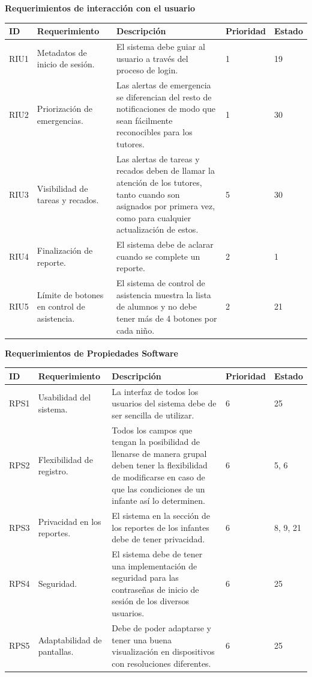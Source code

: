 \documentclass{article}
\begin{document}
	\textbf{Requerimientos de interacción con el usuario}\\
	\begin{longtable}{|p{1.0cm}|p{3.0cm}|p{5.0cm}|p{1.2cm}|p{0.75cm}|}
	\hline
	\textbf{ID} & \textbf{Requerimiento} & \textbf{Descripción} & \textbf{Prioridad} & \textbf{Estado} \\
	\hline
	RIU1 & Metadatos de inicio de sesión. & El sistema debe guiar al usuario a través del proceso de login. & 1 & 19 \\
	\hline
	RIU2 & Priorización de emergencias. & Las alertas de emergencia se diferencian del resto de notificaciones de modo que sean fácilmente reconocibles para los tutores. & 1 & 30 \\
	\hline
	RIU3 & Visibilidad de tareas y recados. & Las alertas de tareas y recados deben de llamar la atención de los tutores, tanto cuando son asignados por primera vez, como para cualquier actualización de estos.  & 5 &  30\\
	\hline
	RIU4 & Finalización de reporte. & El sistema debe de aclarar cuando se complete un reporte. & 2 & 1\\
	\hline
	RIU5 & Límite de botones en control de asistencia. & El sistema de control de asistencia muestra la lista de alumnos y no debe tener más de 4 botones por cada niño. & 2 & 21\\ \hline
	\end{longtable}



	\textbf{Requerimientos de Propiedades Software}\\
	\begin{longtable}{|p{1.0cm}|p{3.0cm}|p{5.0cm}|p{1.2cm}|p{0.75cm}|}
	\hline
	\textbf{ID} & \textbf{Requerimiento} & \textbf{Descripción} & \textbf{Prioridad} & \textbf{Estado} \\
	\hline
	RPS1 & Usabilidad del sistema. &La interfaz de todos los usuarios del sistema debe de ser sencilla de utilizar. & 6 & 25 \\
	\hline
	RPS2 & Flexibilidad de registro. & Todos los campos que tengan la posibilidad de llenarse de manera grupal deben tener la flexibilidad de modificarse en caso de que las condiciones de un infante así lo determinen.  & 6 & 5, 6 \\
	\hline
	RPS3 &  Privacidad en los reportes.& El sistema en la sección de los reportes de los infantes debe de tener privacidad.  & 6 & 8, 9, 21 \\
	\hline
	RPS4 & Seguridad. & El sistema debe de tener una implementación de seguridad para las contraseñas de inicio de sesión de los diversos usuarios. & 6 & 25 \\
	\hline
	RPS5 & Adaptabilidad de pantallas.  & Debe de poder adaptarse y tener una buena visualización en dispositivos con resoluciones diferentes.  & 6 & 25 \\ \hline
	
	
	\end{longtable}
\end{document}

